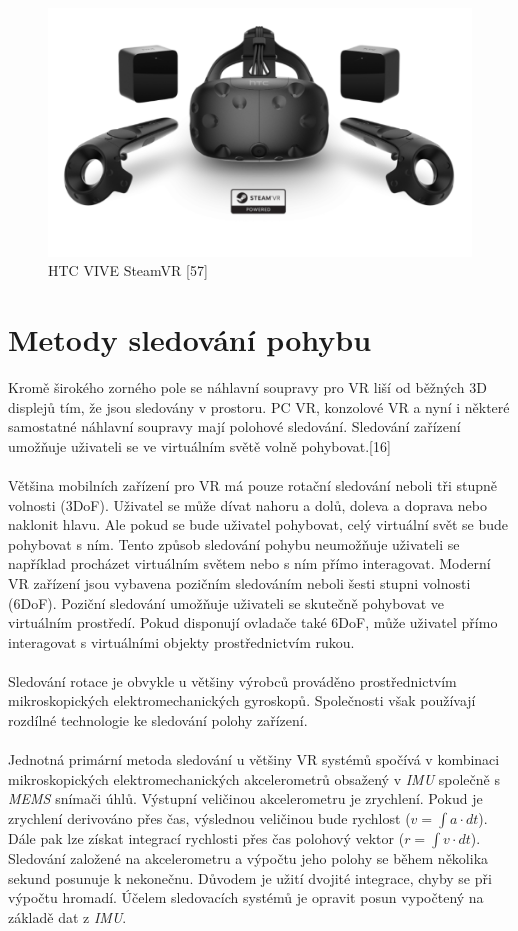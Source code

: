 \documentclass[a4paper, 12pt]{report}
\begin{document}
\begin{figure}[h!]
	\centering
	\includegraphics[width=16cm]{vive_steam.jpg}
	\caption{HTC VIVE SteamVR [57]}
\end{figure}

\section{Metody sledování pohybu}
Kromě širokého zorného pole se náhlavní soupravy pro VR liší od běžných 3D displejů tím, že jsou sledovány v prostoru. PC VR, konzolové VR a nyní i některé samostatné náhlavní soupravy mají polohové sledování. Sledování zařízení umožňuje uživateli se ve virtuálním světě volně pohybovat.[16]\\
\\
Většina mobilních zařízení pro VR má pouze rotační sledování neboli tři stupně volnosti (3DoF). Uživatel se může dívat nahoru a dolů, doleva a doprava nebo naklonit hlavu. Ale pokud se bude uživatel pohybovat, celý virtuální svět se bude pohybovat s ním. Tento způsob sledování pohybu neumožňuje uživateli se například procházet virtuálním světem nebo s ním přímo interagovat. Moderní VR zařízení jsou vybavena pozičním sledováním neboli šesti stupni volnosti (6DoF). Poziční sledování umožňuje uživateli se skutečně pohybovat ve virtuálním prostředí. Pokud disponují ovladače také 6DoF, může uživatel přímo interagovat s virtuálními objekty prostřednictvím rukou.\\
\\
Sledování rotace je obvykle u většiny výrobců prováděno prostřednictvím mikroskopických elektromechanických gyroskopů. Společnosti však používají rozdílné technologie ke sledování polohy zařízení.\\
\\
Jednotná primární metoda sledování u většiny VR systémů spočívá v kombinaci mikroskopických elektromechanických akcelerometrů obsažený v \textit{IMU} společně s \textit{MEMS} snímači úhlů. Výstupní veličinou akcelerometru je zrychlení. Pokud je zrychlení derivováno přes čas, výslednou veličinou bude rychlost ($v=\int a \cdot dt$). Dále pak lze získat integrací rychlosti přes čas polohový vektor ($r=\int v \cdot dt$). Sledování založené na akcelerometru a výpočtu jeho polohy se během několika sekund posunuje k nekonečnu. Důvodem je užití dvojité integrace, chyby se při výpočtu hromadí. Účelem sledovacích systémů je opravit posun vypočtený na základě dat z \textit{IMU}.
\end{document}
